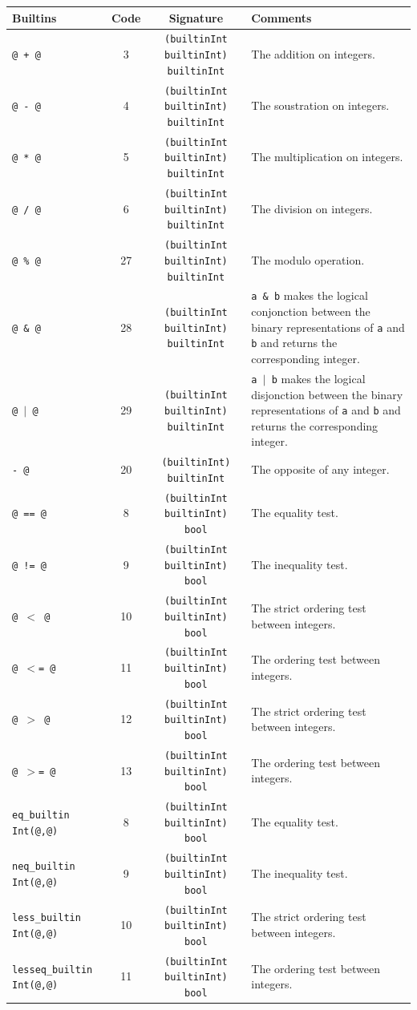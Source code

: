 \begin{tabular}{|p{3cm}|c|c|p{4cm}|}
\hline
{\bf Builtins} & {\bf Code} & {\bf Signature} & {\bf Comments} \\
\hline
\hline
{\tt @ + @}                             & 3 & {\tt (builtinInt builtinInt) builtinInt} & The addition on integers.\\
{\tt @ - @}                             & 4 & {\tt (builtinInt builtinInt) builtinInt} & The soustration on integers.\\
{\tt @ * @}                             & 5 & {\tt (builtinInt builtinInt) builtinInt} & The multiplication on integers.\\
{\tt @ / @}                             & 6 & {\tt (builtinInt builtinInt) builtinInt} & The division on integers.\\
{\tt @ \% @}                            & 27 & {\tt (builtinInt builtinInt) builtinInt} & The modulo operation.\\
{\tt @ \& @}                            & 28 & {\tt (builtinInt builtinInt) builtinInt} & {\tt a \& b} makes the logical conjonction between the binary representations of {\tt a} and {\tt b} and returns the corresponding integer.\\
{\tt @ $|$ @}                           & 29 & {\tt (builtinInt builtinInt) builtinInt} & {\tt a $|$ b} makes the logical disjonction between the binary representations of {\tt a} and {\tt b} and returns the corresponding integer.\\
{\tt - @}                               & 20 & {\tt (builtinInt) builtinInt} & The opposite of any integer.\\
{\tt @ == @}                            & 8 & {\tt (builtinInt builtinInt) bool} & The equality test.\\
{\tt @ != @}                            & 9 & {\tt (builtinInt builtinInt) bool} & The inequality test.\\
{\tt @ $<$ @}                           & 10 & {\tt (builtinInt builtinInt) bool} & The strict ordering test between integers.\\
{\tt @ $<$= @}                          & 11 & {\tt (builtinInt builtinInt) bool} & The ordering test between integers.\\
{\tt @ $>$ @}                           & 12 & {\tt (builtinInt builtinInt) bool} & The strict ordering test between integers.\\
{\tt @ $>$= @}                          & 13 & {\tt (builtinInt builtinInt) bool} & The ordering test between integers.\\
{\tt eq\_builtin Int(@,@)}              & 8 & {\tt (builtinInt builtinInt) bool} & The equality test.\\
{\tt neq\_builtin Int(@,@)}             & 9 & {\tt (builtinInt builtinInt) bool} & The inequality test.\\
{\tt less\_builtin Int(@,@)}            & 10 & {\tt (builtinInt builtinInt) bool} & The strict ordering test between integers.\\
{\tt lesseq\_builtin Int(@,@)}          & 11 & {\tt (builtinInt builtinInt) bool} & The ordering test between integers.\\
\hline
\end{tabular}
